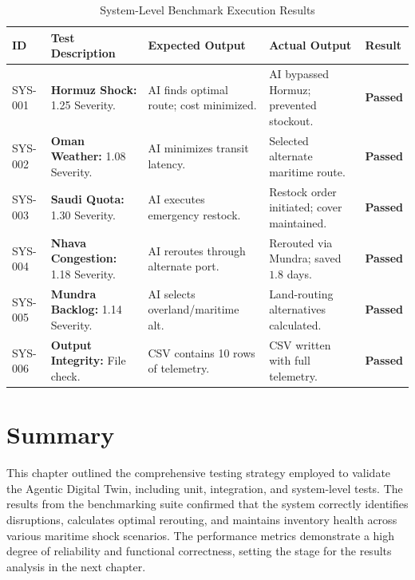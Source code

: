 \begin{table}[H]
    \centering
    \renewcommand{\arraystretch}{1.3}
    \begin{tabularx}{\textwidth}{|l|X|X|X|l|}
    \hline
    \textbf{ID} & \textbf{Test Description} & \textbf{Expected Output} & \textbf{Actual Output} & \textbf{Result} \\ \hline
    SYS-001 & \textbf{Hormuz Shock:} 1.25 Severity. & AI finds optimal route; cost minimized. & AI bypassed Hormuz; prevented stockout. & \textbf{Passed} \\ \hline
    SYS-002 & \textbf{Oman Weather:} 1.08 Severity. & AI minimizes transit latency. & Selected alternate maritime route. & \textbf{Passed} \\ \hline
    SYS-003 & \textbf{Saudi Quota:} 1.30 Severity. & AI executes emergency restock. & Restock order initiated; cover maintained. & \textbf{Passed} \\ \hline
    SYS-004 & \textbf{Nhava Congestion:} 1.18 Severity. & AI reroutes through alternate port. & Rerouted via Mundra; saved $1.8$ days. & \textbf{Passed} \\ \hline
    SYS-005 & \textbf{Mundra Backlog:} 1.14 Severity. & AI selects overland/maritime alt. & Land-routing alternatives calculated. & \textbf{Passed} \\ \hline
    SYS-006 & \textbf{Output Integrity:} File check. & CSV contains 10 rows of telemetry. & CSV written with full telemetry. & \textbf{Passed} \\ \hline
    \end{tabularx}
    \caption{System-Level Benchmark Execution Results}
    \label{tab:system_test_results}
\end{table}
\section[Summary]{Summary}
This chapter outlined the comprehensive testing strategy employed to validate the Agentic Digital Twin, including unit, integration, and system-level tests. The results from the benchmarking suite confirmed that the system correctly identifies disruptions, calculates optimal rerouting, and maintains inventory health across various maritime shock scenarios. The performance metrics demonstrate a high degree of reliability and functional correctness, setting the stage for the results analysis in the next chapter.


